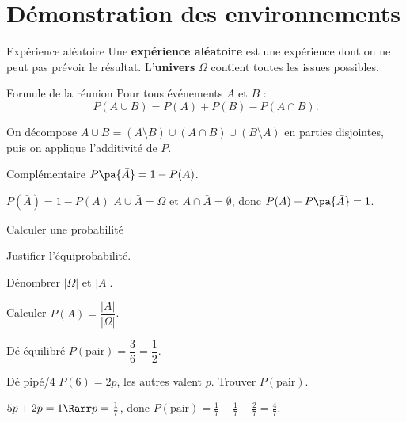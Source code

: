 \section{Démonstration des environnements}

\begin{defin}{Expérience aléatoire}
	Une \textbf{expérience aléatoire} est une expérience dont on ne peut pas
	prévoir le résultat. L'\textbf{univers} $\Omega$ contient toutes les
	issues possibles.
\end{defin}

\begin{theo}{Formule de la réunion}
	Pour tous événements $A$ et $B$ :
	\[
		P(A \cup B) = P(A) + P(B) - P(A \cap B).
	\]
\end{theo}

\begin{demo}{}
	On décompose $A\cup B = (A\setminus B)\cup(A\cap B)\cup(B\setminus A)$
	en parties disjointes, puis on applique l'additivité de $P$.
\end{demo}

\begin{prop}{Complémentaire}
	$P\pa{\bar{A}} = 1 - P(A)$.
\end{prop}

\begin{preuve}{$P(\bar A) = 1-P(A)$}
	$A\cup\bar{A}=\Omega$ et $A\cap\bar{A}=\emptyset$, donc
	$P(A)+P\pa{\bar{A}}=1$.
\end{preuve}

\begin{methode}{Calculer une probabilité}
	\be
	\item Justifier l'équiprobabilité.
	\item Dénombrer $|\Omega|$ et $|A|$.
	\item Calculer $P(A)=\dfrac{|A|}{|\Omega|}$.
	\ee
\end{methode}

\begin{ex}{Dé équilibré}
	$P(\text{pair}) = \dfrac{3}{6} = \dfrac{1}{2}$.
\end{ex}

\begin{exercice}{Dé pipé\hfill /4}
	$P(\text{6})=2p$, les autres valent $p$. Trouver $P(\text{pair})$.
\end{exercice}

\begin{correction}
	$5p+2p=1 \Rarr p=\frac{1}{7}$, donc
	$P(\text{pair})=\frac{1}{7}+\frac{1}{7}+\frac{2}{7}=\frac{4}{7}$.
\end{correction}

